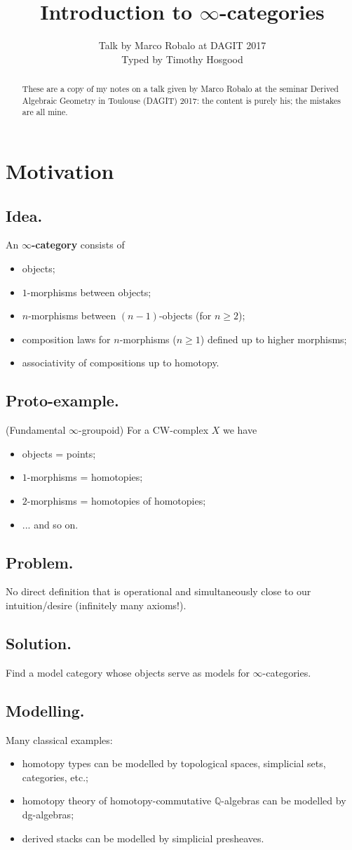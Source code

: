 \documentclass{article}
\title{Introduction to $\infty$-categories}
\author{Talk by Marco Robalo at DAGIT 2017\\Typed by Timothy Hosgood}
\date{\displaydate{date}}
\numberwithin{equation}{subsection}
\renewcommand{\ss}[1]{\subsection{#1}}
\begin{document}
    \maketitle

    \begin{abstract}
        These are a copy of my notes on a talk given by Marco Robalo at the seminar Derived Algebraic Geometry in Toulouse (DAGIT) 2017: the content is purely his; the mistakes are all mine.
    \end{abstract}

    \section{Motivation}

        \ss{Idea.}
            An \textbf{$\infty$-category} consists of
            \begin{itemize}
                \item objects;
                \item $1$-morphisms between objects;
                \item $n$-morphisms between $(n-1)$-objects (for $n\geqslant2$);
                \item composition laws for $n$-morphisms ($n\geqslant1$) defined up to higher morphisms;
                \item associativity of compositions up to homotopy.
            \end{itemize}

        \ss{Proto-example.} (Fundamental $\infty$-groupoid)
            For a CW-complex $X$ we have
            \begin{itemize}
                \item objects = points;
                \item $1$-morphisms = homotopies;
                \item $2$-morphisms = homotopies of homotopies;
                \item ... and so on.
            \end{itemize}

        \ss{Problem.}
            No direct definition that is operational and simultaneously close to our intuition/desire (infinitely many axioms!).

        \ss{Solution.}
            Find a model category whose objects serve as models for $\infty$-categories.

        \ss{Modelling.}
            Many classical examples:
            \begin{itemize}
                \item homotopy types can be modelled by topological spaces, simplicial sets, categories, etc.;
                \item homotopy theory of homotopy-commutative $\mathbb{Q}$-algebras can be modelled by dg-algebras;
                \item derived stacks can be modelled by simplicial presheaves.
            \end{itemize}
\end{document}
